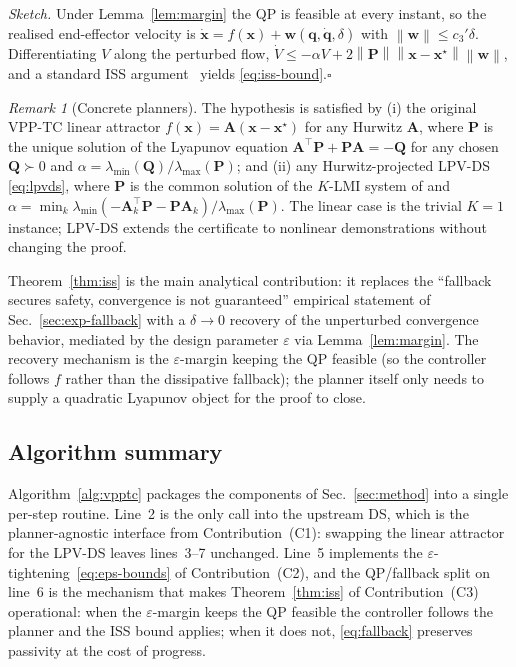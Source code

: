 \documentclass[10pt,conference]{IEEEtran}
\newcommand{\bx}{\bm{x}}
\newcommand{\bq}{\bm{q}}
\newcommand{\bdq}{\dot{\bm{q}}}
\newcommand{\bA}{\bm{A}}
\newcommand{\bP}{\bm{P}}
\newcommand{\norm}[1]{\left\lVert #1 \right\rVert}
\theoremstyle{remark}
\newtheorem{remark}{Remark}
\theoremstyle{plain}
\begin{document}
\noindent\emph{Sketch.} Under Lemma~\ref{lem:margin} the QP is
feasible at every instant, so the realised end-effector velocity
is $\dot{\bx} = f(\bx) + \bm{w}(\bq,\bdq,\delta)$ with
$\norm{\bm{w}}\le c_3'\delta$.
Differentiating $V$ along the perturbed flow,
$\dot V \le -\alpha V + 2\norm{\bP}\norm{\bx-\bx^\star}\norm{\bm{w}}$,
and a standard ISS argument~\cite[\S 4.9]{khalil2002nonlinear}
yields \eqref{eq:iss-bound}.\hfill$\square$

\begin{remark}[Concrete planners]
\label{rem:planners}
The hypothesis is satisfied by (i) the original VPP-TC linear
attractor $f(\bx)=\bA(\bx-\bx^\star)$ for any Hurwitz $\bA$,
where $\bP$ is the unique solution of the Lyapunov equation
$\bA^\top\bP+\bP\bA=-\bm Q$ for any chosen $\bm Q\succ 0$ and
$\alpha=\lambda_{\min}(\bm Q)/\lambda_{\max}(\bP)$;
and (ii) any Hurwitz-projected LPV-DS
\eqref{eq:lpvds}, where $\bP$ is the common solution of the
$K$-LMI system of \cite{figueroa2018lpvds} and
$\alpha=\min_k\lambda_{\min}(-\bA_k^\top\bP-\bP\bA_k)/\lambda_{\max}(\bP)$.
The linear case is the trivial $K{=}1$ instance; LPV-DS extends
the certificate to nonlinear demonstrations without changing the
proof.
\end{remark}

Theorem~\ref{thm:iss} is the main analytical contribution: it
replaces the ``fallback secures safety, convergence is not
guaranteed'' empirical statement of Sec.~\ref{sec:exp-fallback}
with a $\delta\!\to\!0$ recovery of the unperturbed convergence
behavior, mediated by the design parameter $\varepsilon$ via
Lemma~\ref{lem:margin}. The recovery mechanism is the
$\varepsilon$-margin keeping the QP feasible (so the controller
follows $f$ rather than the dissipative fallback); the planner
itself only needs to supply a quadratic Lyapunov object for the
proof to close.

\subsection{Algorithm summary}
Algorithm~\ref{alg:vpptc} packages the components of
Sec.~\ref{sec:method} into a single per-step routine. Line~2 is
the only call into the upstream DS, which is the
planner-agnostic interface from Contribution~(C1):
swapping the linear attractor for the LPV-DS leaves
lines~3--7 unchanged. Line~5 implements the
$\varepsilon$-tightening~\eqref{eq:eps-bounds} of
Contribution~(C2), and the QP/fallback split on line~6 is the
mechanism that makes Theorem~\ref{thm:iss} of Contribution~(C3)
operational: when the $\varepsilon$-margin keeps the QP feasible
the controller follows the planner and the ISS bound applies; when
it does not, \eqref{eq:fallback} preserves passivity at the cost
of progress.
\end{document}
